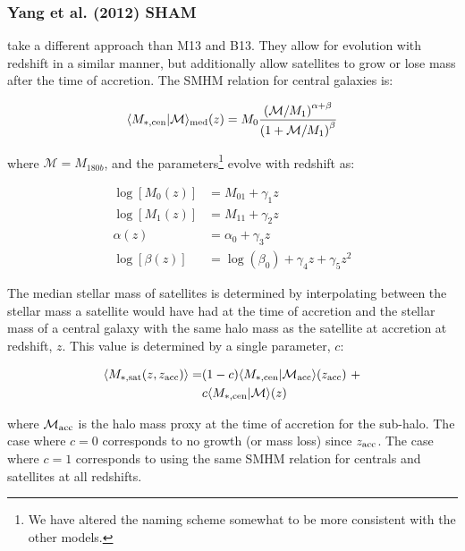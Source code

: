 \documentclass[a4paper,fleqn,usenatbib]{mnras}
\begin{document}
\subsubsection{Yang et al. (2012) SHAM}
\label{sec:y12}

\cite{Yang:2012ew} take a different approach than M13 and B13.  They allow for evolution with redshift in a similar manner, but additionally allow satellites to grow or lose mass after the time of accretion.  The SMHM relation for central galaxies is: 
%
\begin{linenomath}
\begin{equation}
\langle M_{*,\rm cen} |  \mathcal{M} \rangle_{\rm med}(z) = M_{0}\frac{\left( \mathcal{M}/M_1 \right)^{\alpha+\beta}}{\left(1+ \mathcal{M}/M_1 \right)^{\beta}}
\end{equation}  
\end{linenomath}
%
where $\mathcal{M}=M_{180b}$, and the parameters\footnote{We have altered the naming scheme somewhat to be more consistent with the other models.} evolve with redshift as:
%
\begin{linenomath}
\begin{align}
\log[M_{0}(z)] &= M_{01} + \gamma_1 z \\
\log[M_{1}(z)] &= M_{11} + \gamma_2 z \\
\alpha(z) &= \alpha_0 + \gamma_3 z \\
\log[\beta(z)] &= \log(\beta_0) + \gamma_4 z + \gamma_5 z^2
\end{align}
\end{linenomath}
%
The median stellar mass of satellites is determined by interpolating between the stellar mass a satellite would have had at the time of accretion and the stellar mass of a central galaxy with the same halo mass as the satellite at accretion at redshift, $z$.  This value is determined by a single parameter, $c$:
%
\begin{linenomath}
\begin{align}
\label{eq:y12sat_model}
\langle M_{*,\rm sat}(z, z_{\rm acc})\rangle =&  (1-c)\langle M_{*,\rm cen} |  \mathcal{M}_{\rm acc} \rangle(z_{\rm acc})~+ \\ \nonumber &  c\langle M_{*,\rm cen}|  \mathcal{M} \rangle(z)
\end{align}
\end{linenomath}
%
where $\mathcal{M}_{\rm acc}$ is the halo mass proxy at the time of accretion for the sub-halo.  The case where $c=0$ corresponds to no growth (or mass loss) since $z_{\rm acc}$.  The case where $c=1$ corresponds to using the same SMHM relation for centrals and satellites at all redshifts.
\end{document}
